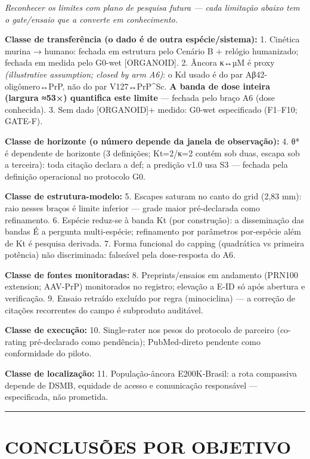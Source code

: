 \documentclass[12pt,a4paper,oneside]{report}
\begin{document}
\emph{Reconhecer os limites com plano de pesquisa futura --- cada
limitação abaixo tem o gate/ensaio que a converte em conhecimento.}

\textbf{Classe de transferência (o dado é de outra espécie/sistema):} 1.
Cinética murina → humano: fechada em estrutura pelo Cenário B + relógio
humanizado; fechada em medida pelo G0-wet {[}ORGANOID{]}. 2. Âncora κ↔µM
é proxy \emph{(illustrative assumption; closed by arm A6)}: o Kd usado é
do par Aβ42-oligômero↔PrP, não do par V127↔PrP\^{}Sc. \textbf{A banda de
dose inteira (largura ≈53×) quantifica este limite} --- fechada pelo
braço A6 (dose conhecida). 3. Sem dado {[}ORGANOID{]}+ medido: G0-wet
especificado (F1--F10; GATE-F).

\textbf{Classe de horizonte (o número depende da janela de observação):}
4. θ* é dependente de horizonte (3 definições; Kt=2/κ=2 contém sob duas,
escapa sob a terceira): toda citação declara a def; a predição v1.0 usa
S3 --- fechada pela definição operacional no protocolo G0.

\textbf{Classe de estrutura-modelo:} 5. Escapes saturam no canto do grid
(2,83 mm): raio nesses braços é limite inferior --- grade maior
pré-declarada como refinamento. 6. Espécie reduz-se à banda Kt (por
construção): a disseminação das bandas É a pergunta multi-espécie;
refinamento por parâmetros por-espécie além de Kt é pesquisa derivada.
7. Forma funcional do capping (quadrática vs primeira potência) não
discriminada: falseável pela dose-resposta do A6.

\textbf{Classe de fontes monitoradas:} 8. Preprints/ensaios em andamento
(PRN100 extension; AAV-PrP) monitorados no registro; elevação a E-ID só
após abertura e verificação. 9. Ensaio retraído excluído por regra
(minociclina) --- a correção de citações recorrentes do campo é
subproduto auditável.

\textbf{Classe de execução:} 10. Single-rater nos pesos do protocolo de
parceiro (co-rating pré-declarado como pendência); PubMed-direto
pendente como conformidade do piloto.

\textbf{Classe de localização:} 11. População-âncora E200K-Brasil: a
rota compassiva depende de DSMB, equidade de acesso e comunicação
responsável --- especificada, não prometida.

\begin{center}\rule{0.5\linewidth}{0.5pt}\end{center}

\hypertarget{conclusuxf5es-por-objetivo}{%
\chapter{CONCLUSÕES POR OBJETIVO}\label{conclusuxf5es-por-objetivo}}
\end{document}
